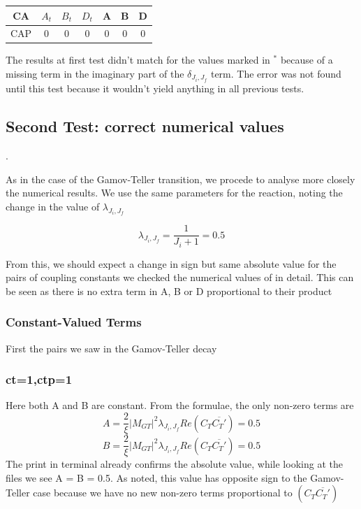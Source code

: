 \documentclass[twocolumn]{article}
\begin{document}
\begin{table}[H]
	\begin{tabular}{|c|c|c|c|c|c|c|}
		\hline
		CA & $A_t$ & $B_t$ & $D_t$ & A & B & D \\
		\hline
		CAP & 0 & 0 & 0 & 0 & 0 & 0\\
		\hline
	\end{tabular}
\end{table}

The results at first test didn't match for the values marked in $^\ast$ because of a missing term in the imaginary part of the $\delta_{J_i,J_f}$ term. The error was not found until this test because it wouldn't yield anything in all previous tests. 

\subsection{Second Test: correct numerical values}.

As in the case of the Gamov-Teller transition, we procede to analyse more closely the numerical results. We use the same parameters for the reaction, noting the change in the value of $\lambda_{J_i,J_f}$  

$$\lambda_{J_i,J_f} = \frac{1}{J_i+1} = 0.5$$

From this, we should expect a change in sign but same absolute value for the pairs of coupling constants we checked the numerical values of in detail. This can be seen as there is no extra term in A, B or D proportional to their product

\subsubsection{Constant-Valued Terms}

First the pairs we saw in the Gamov-Teller decay

\subsubsection*{ct=1,ctp=1}

Here both A and B are constant. From the formulae, the only non-zero terms are 
$$A = \frac{2}{\xi}|M_{GT}|^2\lambda_{J_i,J_f}Re(C_T\overline{C_T'}) = 0.5$$
$$B = \frac{2}{\xi}|M_{GT}|^2\lambda_{J_i,J_f}Re(C_T\overline{C_T'}) = 0.5$$
The print in terminal already confirms the absolute value, while looking at the files we see A = B = 0.5. As noted, this value has opposite sign to the Gamov-Teller case because we have no new non-zero terms proportional to $(C_T\overline{C_T'})$
\end{document}
